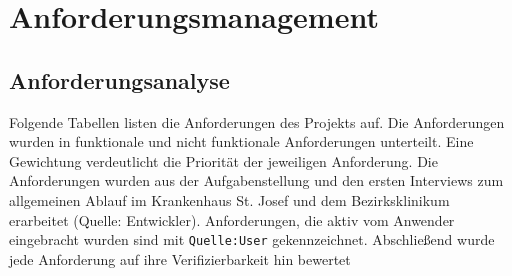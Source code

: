 \documentclass[a4paper, ngerman, 12pt]{scrartcl}
\begin{document}
\section{Anforderungsmanagement}
\subsection{Anforderungsanalyse}
Folgende Tabellen listen die Anforderungen des Projekts auf. Die Anforderungen wurden in funktionale und nicht funktionale Anforderungen unterteilt. Eine Gewichtung verdeutlicht die Priorität der jeweiligen Anforderung. Die Anforderungen wurden aus der Aufgabenstellung und den ersten Interviews zum allgemeinen Ablauf im Krankenhaus St. Josef und dem Bezirksklinikum erarbeitet (Quelle: Entwickler). Anforderungen, die aktiv vom Anwender eingebracht wurden sind mit \texttt{Quelle:User} gekennzeichnet. Abschließend wurde jede Anforderung auf ihre Verifizierbarkeit hin bewertet\\[0.5em]
\end{document}
